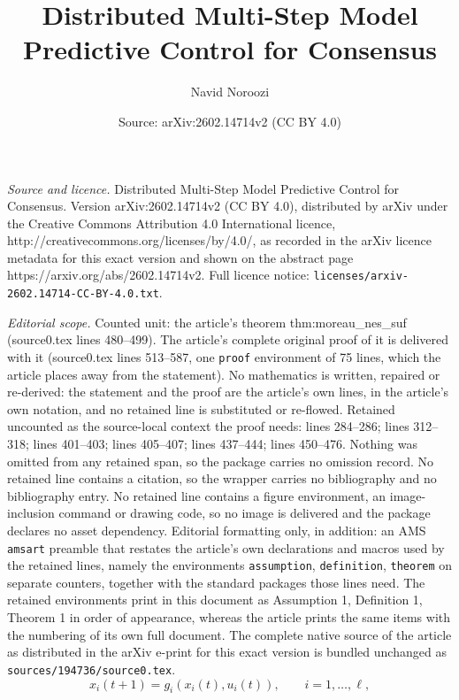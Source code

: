 \documentclass[10pt,a4paper]{amsart}
\title{Distributed Multi-Step Model Predictive Control for Consensus}
\author{Navid Noroozi}
\date{Source: arXiv:2602.14714v2 (CC BY 4.0)}
\begin{document}
\maketitle

\noindent\emph{Source and licence.} Distributed Multi-Step Model Predictive Control for Consensus. Version arXiv:2602.14714v2 (CC BY 4.0), distributed by arXiv under the Creative Commons Attribution 4.0 International licence, http://creativecommons.org/licenses/by/4.0/, as recorded in the arXiv licence metadata for this exact version and shown on the abstract page https://arxiv.org/abs/2602.14714v2. Full licence notice: \texttt{licenses/arxiv-2602.14714-CC-BY-4.0.txt}.\par\smallskip

\noindent\textit{Editorial scope.} Counted unit: the article's theorem thm:moreau\_nes\_suf (source0.tex lines 480--499). The article's complete original proof of it is delivered with it (source0.tex lines 513--587, one \texttt{proof} environment of 75 lines, which the article places away from the statement). No mathematics is written, repaired or re-derived: the statement and the proof are the article's own lines, in the article's own notation, and no retained line is substituted or re-flowed.  Retained uncounted as the source-local context the proof needs: lines 284--286; lines 312--318; lines 401--403; lines 405--407; lines 437--444; lines 450--476.  Nothing was omitted from any retained span, so the package carries no omission record.  No retained line contains a citation, so the wrapper carries no bibliography and no bibliography entry.  No retained line contains a figure environment, an image-inclusion command or drawing code, so no image is delivered and the package declares no asset dependency.  Editorial formatting only, in addition: an AMS \texttt{amsart} preamble that restates the article's own declarations and macros used by the retained lines, namely the environments \texttt{assumption}, \texttt{definition}, \texttt{theorem} on separate counters, together with the standard packages those lines need.  The retained environments print in this document as Assumption 1, Definition 1, Theorem 1 in order of appearance, whereas the article prints the same items with the numbering of its own full document.  The complete native source of the article as distributed in the arXiv e-print for this exact version is bundled unchanged as \texttt{sources/194736/source0.tex}.
\begin{equation}\label{eq:agent_dyn}
x_i(t+1)=g_i(x_i(t),u_i(t)),\qquad i=1,\dots,\ell,
\end{equation}
\end{document}
